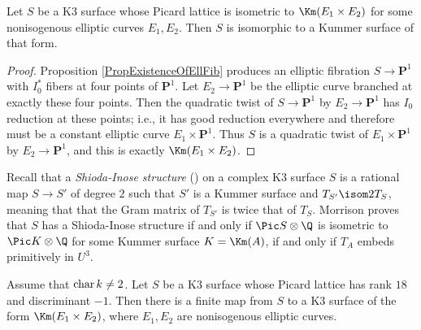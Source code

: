 \documentclass{article}
\newcommand{\adam}[1]{\textcolor{blue}{#1}}
\DeclareMathOperator{\car}{{\rm char}}
\begin{document}
\begin{prop} \label{PropRecognizeKummer} Let $S$ be a K3 surface whose Picard lattice is isometric to $\Km(E_1\times E_2)$ for some nonisogenous elliptic curves $E_1,E_2$.  Then $S$ is isomorphic to a Kummer surface of that form.
\end{prop}

\begin{proof}  Proposition \ref{PropExistenceOfEllFib} produces an elliptic fibration $S\to \mathbf{P}^1$ with $I_0^\ast$ fibers at four points of $\mathbf{P}^1$.  Let $E_2\to \mathbf{P}^1$ be the elliptic curve branched at exactly these four points.  Then the quadratic twist of $S\to \mathbf{P}^1$ by $E_2\to\mathbf{P}^1$ has $I_0$ reduction at these points; i.e., it has good reduction everywhere and therefore must be a constant elliptic curve $E_1\times \mathbf{P}^1$.  Thus $S$ is a quadratic twist of $E_1\times \mathbf{P}^1$ by $E_2\to \mathbf{P}^1$, and this is exactly $\Km(E_1\times E_2)$.  
\end{proof}

\begin{rmk}\label{rem:shioda-inose-exists}
  Recall that a {\em Shioda-Inose structure}
  (\cite[Definition 6.1]{morr}) on a complex K3 surface $S$ is a rational map
  $S \to S'$ of degree $2$ such that $S'$ is a Kummer surface and
  $T_{S'} \isom 2T_{S}$, meaning that that the Gram
  matrix of $T_{S'}$ is twice that of $T_S$.   Morrison proves \cite[Theorem 6.3]{morr} that $S$ has
  a Shioda-Inose structure if and only if $\Pic S \otimes \Q$ is isometric
  to $\Pic K \otimes \Q$ for some Kummer surface $K=\Km(A)$, if and only if
  $T_A$ embeds primitively in $U^3$.
\end{rmk}

\begin{prop}\label{prop:to-kum}
  Assume that $\car k\neq 2$.  Let $S$ be a K3 surface whose Picard lattice has rank $18$ and
  discriminant $-1$.  Then there is a finite map from $S$ to a K3 surface
  of the form $\Km(E_1 \times E_2)$, where
  $E_1,E_2$ are nonisogenous elliptic curves.
\end{prop}
\end{document}
